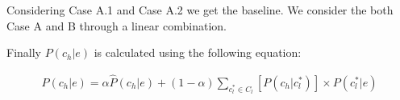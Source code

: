 %

Considering Case A.1 and Case A.2 we get the baseline. We consider the both Case A and B through a linear combination.

Finally  $P({c_h}|e)$ is calculated using the following equation:

\begin{equation}
\begin{split}
P({c_h}|e) = \alpha \hat{P}({c_h}|e)+ (1-\alpha) \sum_{ c_{l}^*\in C_{l} } [P({c_h}|c_{l}^*) ] \times  P(c_{l}^*|e)
\end{split}
\label{eq:pgge}\end{equation}


